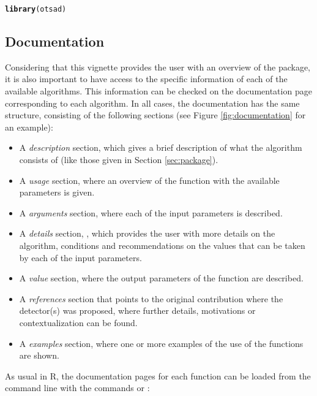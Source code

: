 \documentclass[a4paper]{article}\usepackage[]{graphicx}\usepackage[]{color}
\makeatletter
\newcommand{\hlstd}[1]{\textcolor[rgb]{0.345,0.345,0.345}{#1}}%
\newcommand{\hlkwd}[1]{\textcolor[rgb]{0.737,0.353,0.396}{\textbf{#1}}}%
\newenvironment{kframe}{%
 \def\at@end@of@kframe{}%
 \ifinner\ifhmode%
  \def\at@end@of@kframe{\end{minipage}}%
  \begin{minipage}{\columnwidth}%
 \fi\fi%
 \def\FrameCommand##1{\hskip\@totalleftmargin \hskip-\fboxsep
 \colorbox{shadecolor}{##1}\hskip-\fboxsep
     \hskip-\linewidth \hskip-\@totalleftmargin \hskip\columnwidth}%
 \MakeFramed {\advance\hsize-\width
   \@totalleftmargin\z@ \linewidth\hsize
   \@setminipage}}%
 {\par\unskip\endMakeFramed%
 \at@end@of@kframe}
\newenvironment{knitrout}{}{} %
\makeatother
\begin{document}
\begin{knitrout}
\color{fgcolor}\begin{kframe}
\begin{alltt}
\hlkwd{library}\hlstd{(otsad)}
\end{alltt}
\end{kframe}
\end{knitrout}

\subsection{Documentation}\label{sec:documentation}

Considering that this vignette provides the user with an overview of the  package, it is also important to have access to the specific information of each of the available algorithms. This information can be checked on the documentation page corresponding to each algorithm. In all cases, the documentation has the same structure, consisting of the following sections (see Figure \ref{fig:documentation} for an example):

\begin{itemize}
\item A \emph{description} section, which gives a brief description of what the algorithm consists of (like those given in Section \ref{sec:package}).
\item A \emph{usage} section, where an overview of the function with the available parameters is given.
\item A \emph{arguments} section, where each of the input parameters is described.
\item A \emph{details} section, , which provides the user with more details on the algorithm, conditions and recommendations on the values that can be taken by each of the input parameters.
\item A \emph{value} section, where the output parameters of the function are described.
\item A \emph{references} section that points to the original contribution where the detector(s) was proposed, where further details, motivations or contextualization can be found.
\item A \emph{examples} section, where one or more examples of the use of the functions are shown.
\end{itemize}

As usual in R, the documentation pages for each function can be loaded from the command line with the commands  or :
\end{document}
